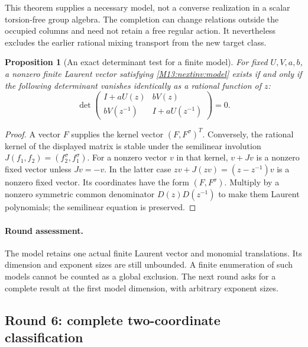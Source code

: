 \documentclass[11pt,a4paper,oneside]{report}
\newtheorem{proposition}[theorem]{Proposition}
\theoremstyle{definition}
\theoremstyle{remark}
\begin{document}
This theorem supplies a necessary model, not a converse realization
in a scalar torsion-free group algebra. The completion can change
relations outside the occupied columns and need not retain a free
regular action. It nevertheless excludes the earlier rational mixing
transport from the new target class.

\begin{proposition}[An exact determinant test for a finite model]
\label{M13:nextinv:determinant}
For fixed $U,V,a,b$, a nonzero finite Laurent vector satisfying
\eqref{M13:nextinv:model} exists if and only if the following determinant
vanishes identically as a rational function of $z$:
\begin{equation}\label{M13:nextinv:pencil}
 \det\begin{pmatrix}
 I+aU(z)&bV(z)\\
 bV(z^{-1})&I+aU(z^{-1})
 \end{pmatrix}=0.
\end{equation}
\end{proposition}
\begin{proof}
A vector $F$ supplies the kernel vector $(F,F^\sigma)^T$.
Conversely, the rational kernel of the displayed matrix is stable
under the semilinear involution
$J(f_1,f_2)=(f_2^\sigma,f_1^\sigma)$.
For a nonzero vector $v$ in that kernel, $v+Jv$ is a nonzero fixed
vector unless $Jv=-v$. In the latter case
$zv+J(zv)=(z-z^{-1})v$ is a nonzero fixed vector.
Its coordinates have the form $(F,F^\sigma)$.
Multiply by a nonzero symmetric common denominator
$D(z)D(z^{-1})$ to make them Laurent polynomials; the semilinear
equation is preserved.
\end{proof}

\paragraph{Round assessment.}
The model retains one actual finite Laurent vector and monomial
translations. Its dimension and exponent sizes are still unbounded.
A finite enumeration of such models cannot be counted as a global
exclusion. The next round asks for a complete result at the first
model dimension, with arbitrary exponent sizes.

\subsection{Round 6: complete two-coordinate classification}
\end{document}
